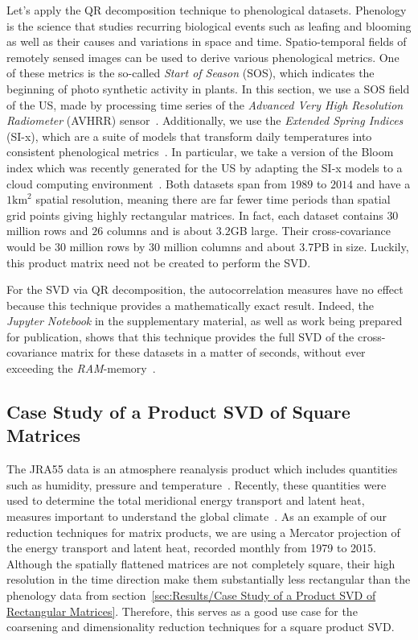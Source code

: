 \documentclass[ijgi,article,submit,moreauthors,pdftex,10pt,a4paper]{Definitions/mdpi}
\begin{document}
Let's apply the QR decomposition technique to phenological datasets. Phenology is the science that studies recurring biological events such as leafing and blooming as well as their causes and variations in space and time. Spatio-temporal fields of remotely sensed images can be used to derive various phenological metrics. One of these metrics is the so-called \textit{Start of Season} (SOS), which indicates the beginning of photo synthetic activity in plants. In this section, we use a SOS field of the US, made by processing time series of the \textit{Advanced Very High Resolution Radiometer} (AVHRR) sensor~\cite{Reed1994}. Additionally, we use the \textit{Extended Spring Indices} (SI-x), which are a suite of models that transform daily temperatures into consistent phenological metrics~\cite{Schwartz2013}. In particular, we take a version of the Bloom index which was recently generated for the US by adapting the SI-x models to a cloud computing environment~\cite{Izquierdo2015}. Both datasets span from $1989$ to $2014$ and have a $1\text{km}^2$ spatial resolution, meaning there are far fewer time periods than spatial grid points giving highly rectangular matrices. In fact, each dataset contains $30$ million rows and $26$ columns and is about $3.2$GB large. Their cross-covariance would be $30$ million rows by $30$ million columns and about $3.7$PB in size. Luckily, this product matrix need not be created to perform the SVD.

For the SVD via QR decomposition, the autocorrelation measures have no effect because this technique provides a mathematically exact result. Indeed, the \textit{Jupyter Notebook} in the supplementary material, as well as work being prepared for publication, shows that this technique provides the full SVD of the cross-covariance matrix for these datasets in a matter of seconds, without ever exceeding the \textit{RAM}-memory~\cite{Bogaardt2018, ZuritaMilla2018}.

\subsection{Case Study of a Product SVD of Square Matrices}
\label{sec:Results/Case Study of a Product SVD of Square Matrices}

The JRA55 data is an atmosphere reanalysis product which includes quantities such as humidity, pressure and temperature~\cite{Kobayashi2015}. Recently, these quantities were used to determine the total meridional energy transport and latent heat, measures important to understand the global climate~\cite{Liu2018}. As an example of our reduction techniques for matrix products, we are using a Mercator projection of the energy transport and latent heat, recorded monthly from 1979 to 2015. Although the spatially flattened matrices are not completely square, their high resolution in the time direction make them substantially less rectangular than the phenology data from section~\ref{sec:Results/Case Study of a Product SVD of Rectangular Matrices}. Therefore, this serves as a good use case for the coarsening and dimensionality reduction techniques for a square product SVD.
\end{document}
